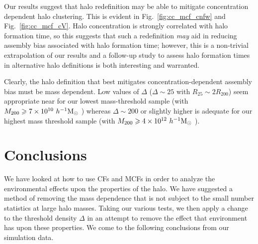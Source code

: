 \documentclass[usenatbib,fleqn]{mnras}
\begin{document}
Our results suggest that halo redefinition may be able to mitigate concentration dependent halo clustering. This is evident in Fig.~\ref{fig:cc_mcf_cnfw} and Fig.~\ref{fig:cc_mcf_cV}. Halo concentration is strongly correlated with halo formation time, so this suggests that such a redefinition {\em may} aid in reducing assembly bias associated with halo formation time; however, this is a non-trivial extrapolation of our results and a follow-up study to assess halo formation times in alternative halo definitions is both interesting and warranted. 

Clearly, the halo definition that best mitigates concentration-dependent assembly bias must be mass dependent. Low values of $\Delta$ ($\Delta \sim 25$ with $R_{25} \sim 2R_{200}$) seem appropriate near for our lowest mass-threshold sample (with $M_{200} \geqslant 7 \times 10^{10} \ h^{-1}\mathrm{M}_{\odot}~$) whereas $\Delta \sim 200$ or slightly higher is adequate for our highest mass threshold sample (with $M_{200} \geqslant 4 \times 10^{12} \ h^{-1}\mathrm{M}_{\odot}~$). 


\section[]{Conclusions}
\label{section:conclusions}

We have looked at how to use CFs and MCFs in order to analyze the environmental effects upon the properties of the halo. We have suggested a method of removing the mass dependence that is not subject to the small number statistics at large halo masses. Taking our various tests, we then apply a change to the threshold density $\Delta$ in an attempt to remove the effect that environment has upon these properties. We come to the following conclusions from our simulation data.
\end{document}
